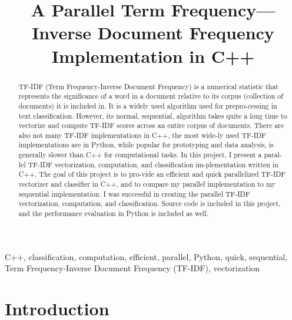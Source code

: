 \documentclass[conference]{IEEEtran}
\begin{document}
\title{A Parallel Term Frequency---Inverse Document Frequency Implementation in C++} %


\author{
}

\maketitle

\begin{abstract}
    TF-IDF (Term Frequency-Inverse Document Frequency) is a numerical statistic that represents the significance of a word in a document relative to its corpus (collection of documents) it is included in. It is a widely used algorithm used for prepro-cessing in text classification. However, its normal, sequential, algorithm takes quite a long time to vectorize and compute TF-IDF scores across an entire corpus of documents. There are also not many TF-IDF implementations in C++, the most wide-ly used TF-IDF implementations are in Python,  while popular for prototyping and data analysis, is generally slower than C++ for computational tasks. In this project, I present a paral-lel TF-IDF vectorization, computation, and classification im-plementation written in C++. The goal of this project is to pro-vide an efficient and quick parallelized TF-IDF vectorizer and classifier in C++, and to compare my parallel implementation to my sequential implementation. I was successful in creating the parallel TF-IDF vectorization, computation, and classification. Source code is included in this project, and the performance evaluation in Python is included as well. 
\end{abstract}

\begin{IEEEkeywords}
    C++, classification, computation, efficient, parallel, Python, quick, sequential, Term Frequency-Inverse Document Frequency (TF-IDF), vectorization
\end{IEEEkeywords}

\section{Introduction} \label{sec:introduction}
\end{document}
